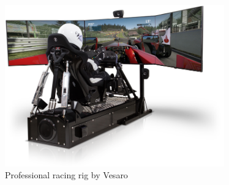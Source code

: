 \begin{figure}[!htb]
	\centering
	\includegraphics[height=7cm]{images/proracingrig}
	\caption{Professional racing rig by Vesaro}
	\label{fig:slipangle}
\end{figure}







